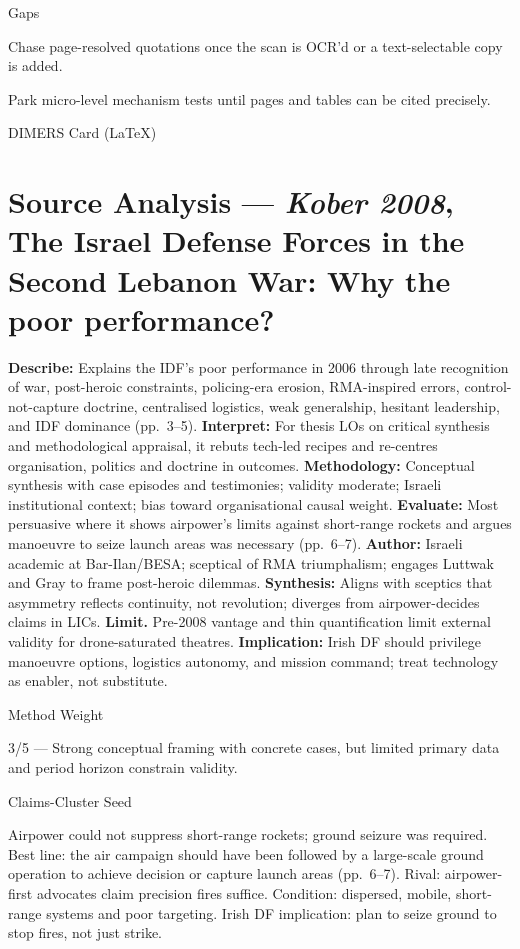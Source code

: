 Gaps

Chase page-resolved quotations once the scan is OCR’d or a text-selectable copy is added.

Park micro-level mechanism tests until pages and tables can be cited precisely.


\parencite{KOBER_2008}

DIMERS Card (LaTeX)

\section*{Source Analysis — \textit{Kober 2008}, The Israel Defense Forces in the Second Lebanon War: Why the poor performance?}
\textbf{Describe:} Explains the IDF’s poor performance in 2006 through late recognition of war, post-heroic constraints, policing-era erosion, RMA-inspired errors, control-not-capture doctrine, centralised logistics, weak generalship, hesitant leadership, and IDF dominance (pp.~3–5).
\textbf{Interpret:} For thesis LOs on critical synthesis and methodological appraisal, it rebuts tech-led recipes and re-centres organisation, politics and doctrine in outcomes.
\textbf{Methodology:} Conceptual synthesis with case episodes and testimonies; validity moderate; Israeli institutional context; bias toward organisational causal weight.
\textbf{Evaluate:} Most persuasive where it shows airpower’s limits against short-range rockets and argues manoeuvre to seize launch areas was necessary (pp.~6–7).
\textbf{Author:} Israeli academic at Bar-Ilan/BESA; sceptical of RMA triumphalism; engages Luttwak and Gray to frame post-heroic dilemmas.
\textbf{Synthesis:} Aligns with sceptics that asymmetry reflects continuity, not revolution; diverges from airpower-decides claims in LICs.
\textbf{Limit.} Pre-2008 vantage and thin quantification limit external validity for drone-saturated theatres.
\textbf{Implication:} Irish DF should privilege manoeuvre options, logistics autonomy, and mission command; treat technology as enabler, not substitute.

Method Weight

3/5 — Strong conceptual framing with concrete cases, but limited primary data and period horizon constrain validity.

Claims-Cluster Seed

Airpower could not suppress short-range rockets; ground seizure was required.
Best line: the air campaign should have been followed by a large-scale ground operation to achieve decision or capture launch areas (pp.~6–7). Rival: airpower-first advocates claim precision fires suffice. Condition: dispersed, mobile, short-range systems and poor targeting. Irish DF implication: plan to seize ground to stop fires, not just strike.

